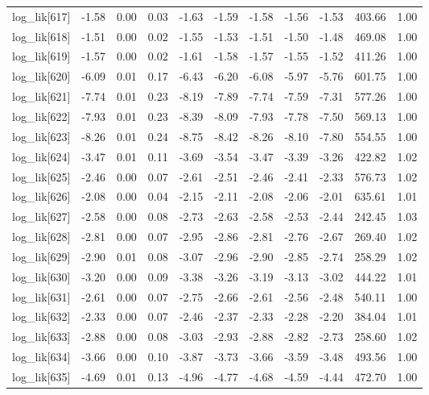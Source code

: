 \begin{table}[ht]
\begin{tabular}{rrrrrrrrrrr}
  log\_lik[617] & -1.58 & 0.00 & 0.03 & -1.63 & -1.59 & -1.58 & -1.56 & -1.53 & 403.66 & 1.00 \\ 
  log\_lik[618] & -1.51 & 0.00 & 0.02 & -1.55 & -1.53 & -1.51 & -1.50 & -1.48 & 469.08 & 1.00 \\ 
  log\_lik[619] & -1.57 & 0.00 & 0.02 & -1.61 & -1.58 & -1.57 & -1.55 & -1.52 & 411.26 & 1.00 \\ 
  log\_lik[620] & -6.09 & 0.01 & 0.17 & -6.43 & -6.20 & -6.08 & -5.97 & -5.76 & 601.75 & 1.00 \\ 
  log\_lik[621] & -7.74 & 0.01 & 0.23 & -8.19 & -7.89 & -7.74 & -7.59 & -7.31 & 577.26 & 1.00 \\ 
  log\_lik[622] & -7.93 & 0.01 & 0.23 & -8.39 & -8.09 & -7.93 & -7.78 & -7.50 & 569.13 & 1.00 \\ 
  log\_lik[623] & -8.26 & 0.01 & 0.24 & -8.75 & -8.42 & -8.26 & -8.10 & -7.80 & 554.55 & 1.00 \\ 
  log\_lik[624] & -3.47 & 0.01 & 0.11 & -3.69 & -3.54 & -3.47 & -3.39 & -3.26 & 422.82 & 1.02 \\ 
  log\_lik[625] & -2.46 & 0.00 & 0.07 & -2.61 & -2.51 & -2.46 & -2.41 & -2.33 & 576.73 & 1.02 \\ 
  log\_lik[626] & -2.08 & 0.00 & 0.04 & -2.15 & -2.11 & -2.08 & -2.06 & -2.01 & 635.61 & 1.01 \\ 
  log\_lik[627] & -2.58 & 0.00 & 0.08 & -2.73 & -2.63 & -2.58 & -2.53 & -2.44 & 242.45 & 1.03 \\ 
  log\_lik[628] & -2.81 & 0.00 & 0.07 & -2.95 & -2.86 & -2.81 & -2.76 & -2.67 & 269.40 & 1.02 \\ 
  log\_lik[629] & -2.90 & 0.01 & 0.08 & -3.07 & -2.96 & -2.90 & -2.85 & -2.74 & 258.29 & 1.02 \\ 
  log\_lik[630] & -3.20 & 0.00 & 0.09 & -3.38 & -3.26 & -3.19 & -3.13 & -3.02 & 444.22 & 1.01 \\ 
  log\_lik[631] & -2.61 & 0.00 & 0.07 & -2.75 & -2.66 & -2.61 & -2.56 & -2.48 & 540.11 & 1.00 \\ 
  log\_lik[632] & -2.33 & 0.00 & 0.07 & -2.46 & -2.37 & -2.33 & -2.28 & -2.20 & 384.04 & 1.01 \\ 
  log\_lik[633] & -2.88 & 0.00 & 0.08 & -3.03 & -2.93 & -2.88 & -2.82 & -2.73 & 258.60 & 1.02 \\ 
  log\_lik[634] & -3.66 & 0.00 & 0.10 & -3.87 & -3.73 & -3.66 & -3.59 & -3.48 & 493.56 & 1.00 \\ 
  log\_lik[635] & -4.69 & 0.01 & 0.13 & -4.96 & -4.77 & -4.68 & -4.59 & -4.44 & 472.70 & 1.00 \\ 

\end{tabular}
\end{table}
